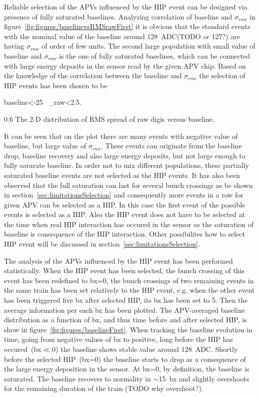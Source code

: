 Reliable selection of the APVs influenced by the HIP event can be designed via presence of fully saturated baselines. Analyzing correlation of baseline and $\sigma_{raw}$ in figure~\ref{fig:figures/baselinevsRMSrawFirst} it is obvious that the standard events with the nominal value of the baseline around 128~ADC(TODO or 127?) are having $\sigma_{raw}$ of order of few units. The second large population with small value of baseline and $\sigma_{raw}$ is the one of fully saturated baselines, which can be connected with large energy deposits in the sensor read by the given APV chip. Based on the knowledge of the correlation between the baseline and $\sigma_{raw}$ the selection of HIP events has been chosen to be 

{
baseline<-25~  \sigma_{raw}<2.5.
}

                 {0.6}       %
                 {The 2-D distribution of RMS spread of raw digis versus baseline. } %

It can be seen that on the plot there are many events with negative value of baseline, but large value of $\sigma_{raw}$. These events can originate from the baseline drop, baseline recovery and also large energy deposits, but not large enough to fully saturate baseline. In order not to mix different populations, these partially saturated baseline events are not selected as the HIP events. It has also been observed that the full saturation can last for several bunch crossings as be shown in section~\ref{sec:limitationsSelection} and consequently more events in a row for given APV can be selected as a HIP. In this case the first event of the possible events is selected as a HIP. Also the HIP event does not have to be selected at the time when real HIP interaction has occured in the sensor as the saturation of baseline is consequence of the HIP interaction. Other possibilites how to select HIP event will be discussed in section~\ref{sec:limitationsSelection}.

The analysis of the APVs influenced by the HIP event has been performed statistically. When the HIP event has been selected, the bunch crossing of this event has been redefined to bx=0, the bunch crossings of two remaining events in the same train has been set relatively to the HIP event, e.g. when the other event has been triggered five bx after selected HIP, its bx has been set to 5. Then the average information per each bx has been plotted. The APV-averaged baseline distribution as a function of bx, and thus time before and after selected HIP, is show in figure~\ref{fig:figures/baselineFirst}. When tracking the baseline evolution in time, going from negative values of bx to positive, long before the HIP has occured~(bx$\ll$0) the baseline shows stable value around 128~ADC. Shortly before the selected HIP~(bx=0) the baseline starts to drop as a consequence of the large energy deposition in the sensor. At bx=0, by definition, the baseline is saturated. The baseline recovers to normality in $\sim$15~bx and slightly overshoots for the remaining duration of the train (TODO why overshoot?).

